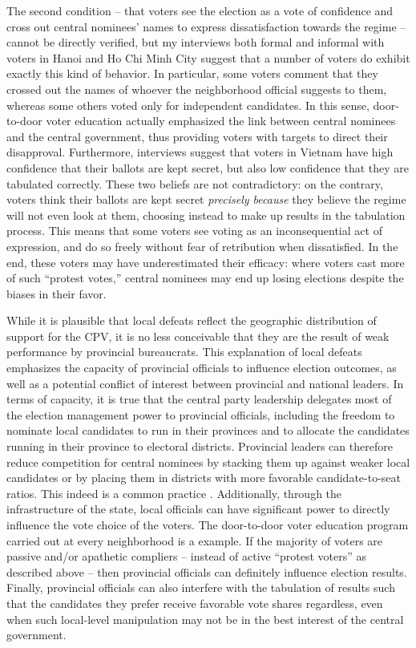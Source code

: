 \documentclass[12pt]{article}\usepackage[]{graphicx}\usepackage[]{color}
\newcommand{\1}{\mathbbm{1}}
\begin{document}
The second condition -- that voters see the election as a vote of confidence and cross out central nominees' names to express dissatisfaction towards the regime -- cannot be directly verified, but my interviews both formal and informal with voters in Hanoi and Ho Chi Minh City suggest that a number of voters do exhibit exactly this kind of behavior. In particular, some voters comment that they crossed out the names of whoever the neighborhood official suggests to them, whereas some others voted only for independent candidates. In this sense, door-to-door voter education actually emphasized the link between central nominees and the central government, thus providing voters with targets to direct their disapproval. Furthermore, interviews suggest that voters in Vietnam have high confidence that their ballots are kept secret, but also low confidence that they are tabulated correctly. These two beliefs are not contradictory: on the contrary, voters think their ballots are kept secret \textit{precisely because} they believe the regime will not even look at them, choosing instead to make up results in the tabulation process. This means that some voters see voting as an inconsequential act of expression, and do so freely without fear of retribution when dissatisfied. In the end, these voters may have underestimated their efficacy: where voters cast more of such ``protest votes,'' central nominees may end up losing elections despite the biases in their favor.

While it is plausible that local defeats reflect the geographic distribution of support for the CPV, it is no less conceivable that they are the result of weak performance by provincial bureaucrats. This explanation of local defeats emphasizes the capacity of provincial officials to influence election outcomes, as well as a potential conflict of interest between provincial and national leaders. In terms of capacity, it is true that the central party leadership delegates most of the election management power to provincial officials, including the freedom to nominate local candidates to run in their provinces and to allocate the candidates running in their province to electoral districts. Provincial leaders can therefore reduce competition for central nominees by stacking them up against weaker local candidates or by placing them in districts with more favorable candidate-to-seat ratios. This indeed is a common practice \cite[provided confirmatory evidence for the 2007 election, which I replicated successfully for the 2011 and 2016 elections]{MaleskySchuler2011}.  Additionally, through the infrastructure of the state, local officials can have significant power to directly influence the vote choice of the voters. The door-to-door voter education program carried out at every neighborhood is a example. If the majority of voters are passive and/or apathetic compliers -- instead of active ``protest voters'' as described above -- then provincial officials can definitely influence election results. Finally, provincial officials can also interfere with the tabulation of results such that the candidates they prefer receive favorable vote shares regardless, even when such local-level manipulation may not be in the best interest of the central government. 
\end{document}
